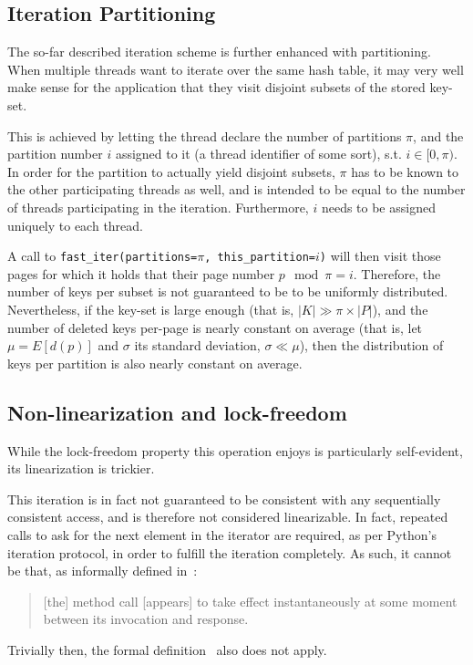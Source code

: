 \subsection{Iteration Partitioning}\label{subsec:iteration-partitioning}

The so-far described iteration scheme is further enhanced with partitioning.
When multiple threads want to iterate over the same hash table, it may very well make sense for the application that they visit disjoint subsets of the stored key-set.

This is achieved by letting the thread declare the number of partitions $\pi$, and the partition number $i$ assigned to it (a thread identifier of some sort), s.t. $i \in [0, \pi)$.
In order for the partition to actually yield disjoint subsets, $\pi$ has to be known to the other participating threads as well, and is intended to be equal to the number of threads participating in the iteration.
Furthermore, $i$ needs to be assigned uniquely to each thread.

A call to \texttt{{fast\_iter(partitions=$\pi$, this\_partition=$i$)}} will then visit those pages for which it holds that their page number $p \mod \pi = i$.
Therefore, the number of keys per subset is not guaranteed to be to be uniformly distributed.
Nevertheless, if the key-set is large enough (that is, $|K| \gg \pi \times |P|$), and the number of deleted keys per-page is nearly constant on average (that is, let $\mu = E[d(p)]$ and $\sigma$ its standard deviation, $\sigma \ll \mu$), then the distribution of keys per partition is also nearly constant on average.


\subsection{Non-linearization and lock-freedom}\label{subsec:iteration-linearization-lock-freedom}
While the lock-freedom property this operation enjoys is particularly self-evident, its linearization is trickier.

This iteration is in fact not guaranteed to be consistent with any sequentially consistent access, and is therefore not considered linearizable.
In fact, repeated calls to ask for the next element in the iterator are required, as per Python's iteration protocol, in order to fulfill the iteration completely.
As such, it cannot be that, as informally defined in~\cite[Principle~3.5.1]{art-mp}:
\begin{quote}
	[the] method call [appears] to take effect instantaneously at some moment between its invocation and response.
\end{quote}
Trivially then, the formal definition~\cite[Definition~3.6.1]{art-mp} also does not apply.

